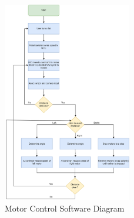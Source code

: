 \begin{figure}[H]
	\centering
	\includegraphics[width=0.5\textwidth]{./Images/motorsw.drawio.png}
	\caption{\label{fig:motorsw}Motor Control Software Diagram}
\end{figure}


